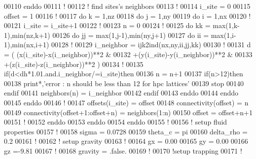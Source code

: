 \begin{DoxyCode}
00110 \textcolor{keyword}{enddo}
00111 \textcolor{comment}{!}
00112 \textcolor{comment}{! find sites's neighbors}
00113 \textcolor{comment}{!}
00114 i\_site = 0
00115 offset = 1
00116 \textcolor{comment}{!}
00117 \textcolor{keyword}{do} k = 1,nz
00118    \textcolor{keyword}{do} j = 1,ny
00119       \textcolor{keyword}{do} i = 1,nx
00120          \textcolor{comment}{!}
00121          i\_site = i\_site+1
00122          \textcolor{comment}{!}
00123          n = 0
00124          \textcolor{comment}{!}
00125          \textcolor{keyword}{do} kk = max(1,k-1),min(nz,k+1)
00126             \textcolor{keyword}{do} jj = max(1,j-1),min(ny,j+1)
00127                \textcolor{keyword}{do} ii = max(1,i-1),min(nx,i+1)
00128                   \textcolor{comment}{!}
00129                   i\_neighbor = ijk2ind(nx,ny,ii,jj,kk)
00130                   \textcolor{comment}{!}
00131                   d = ( (x(i\_site)-x(i\_neighbor))**2 &
00132                        +(y(i\_site)-y(i\_neighbor))**2 &
00133                        +(z(i\_site)-z(i\_neighbor))**2 )
00134                   \textcolor{comment}{!}
00135                   \textcolor{keyword}{if}(d<dh*1.01.and.i\_neighbor/=i\_site)\textcolor{keyword}{then}
00136                      n = n+1
00137                      \textcolor{keyword}{if}(n>12)\textcolor{keyword}{then}
00138                         print*,\textcolor{stringliteral}{'error : n should be less than 12 for hpc
       lattices'}
00139                         stop
00140                      \textcolor{keyword}{endif}
00141                      neighbors(n) = i\_neighbor
00142                   \textcolor{keyword}{endif}
00143                \textcolor{keyword}{enddo}
00144             \textcolor{keyword}{enddo}
00145          \textcolor{keyword}{enddo}
00146          \textcolor{comment}{!}
00147          offsets(i\_site) = offset
00148          connectivity(offset) = n
00149          connectivity(offset+1:offset+n) = neighbors(1:n)
00150          offset = offset+n+1
00151          \textcolor{comment}{!}
00152       \textcolor{keyword}{enddo}
00153    \textcolor{keyword}{enddo}
00154 \textcolor{keyword}{enddo}
00155 \textcolor{comment}{!}
00156 \textcolor{comment}{! setup fluid properties}
00157 \textcolor{comment}{!}
00158 sigma = 0.0728
00159 theta\_c = pi
00160 delta\_rho  = 0.2
00161 \textcolor{comment}{!}
00162 \textcolor{comment}{! setup gravity}
00163 \textcolor{comment}{!}
00164 gx = 0.00
00165 gy = 0.00
00166 gz =-9.81
00167 \textcolor{comment}{!}
00168 gravity = .false.
00169 \textcolor{comment}{!}
00170 \textcolor{comment}{!setup trapping}
00171 \textcolor{comment}{!}

\end{DoxyCode}

